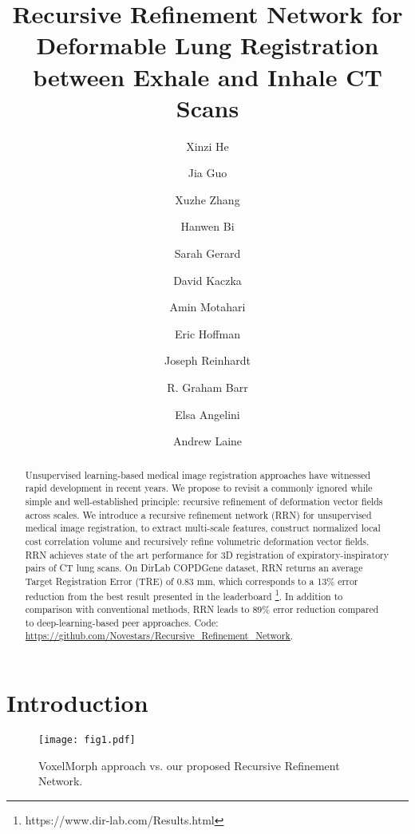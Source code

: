 \documentclass[runningheads]{llncs}
\begin{document}
\title{Recursive Refinement Network for Deformable Lung Registration between Exhale and Inhale CT Scans}\author{Xinzi He \and
Jia Guo \and
Xuzhe Zhang  \and
Hanwen Bi \and
Sarah Gerard \and
David Kaczka \and
Amin Motahari \and
Eric Hoffman \and
Joseph Reinhardt  \and
R. Graham Barr  \and
Elsa Angelini \and
Andrew Laine }
\maketitle              \begin{abstract}
Unsupervised learning-based medical image registration approaches have witnessed rapid development in recent years. We propose to revisit a commonly ignored while simple and well-established principle: recursive refinement of deformation vector fields across scales. We introduce a recursive refinement network (RRN) for unsupervised medical image registration, to extract multi-scale features, construct normalized local cost correlation volume and recursively refine volumetric deformation vector fields. RRN achieves state of the art performance for 3D registration of expiratory-inspiratory pairs of CT lung scans. On DirLab COPDGene dataset, RRN returns an average Target Registration Error (TRE) of 0.83 mm, which corresponds to a 13\% error reduction from the best result presented in the leaderboard \footnote{https://www.dir-lab.com/Results.html}. In addition to comparison with conventional methods, RRN leads to 89\% error reduction compared to deep-learning-based peer approaches. Code: \href{https://github.com/Novestars/Recursive_Refinement_Network}{https://github.com/Novestars/Recursive\_Refinement\_Network}.

\end{abstract}
\section{Introduction}
\begin{figure}[t]
\texttt{[image: fig1.pdf]}
\caption{VoxelMorph \cite{balakrishnanVoxelMorphLearningFramework2019} approach vs. our proposed Recursive Refinement Network.} \label{fig1}
\end{figure}
\end{document}
